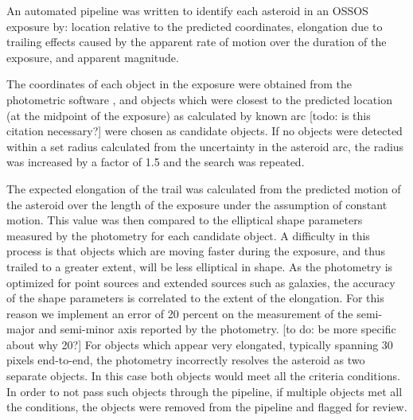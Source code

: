 \documentclass[iop,apj]{emulateapj}
\begin{document}
An automated pipeline was written to identify each asteroid in an OSSOS exposure by: location relative to the predicted coordinates,  elongation due to trailing effects caused by the apparent rate of motion over the duration of the exposure, and apparent magnitude. 

The coordinates of each object in the exposure were obtained from the photometric software \citep{sep}, and objects which were closest to the predicted location (at the midpoint of the exposure) as calculated by known arc \citep{jpl} [todo: is this citation necessary?] were chosen as candidate objects. If no objects were detected within a set radius calculated from the uncertainty in the asteroid arc, the radius was increased by a factor of 1.5 and the search was repeated.

The expected elongation of the trail was calculated from the predicted motion of the asteroid over the length of the exposure \citep{jpl} under the assumption of constant motion. This value was then compared to the elliptical shape parameters measured by the photometry for each candidate object. 
A difficulty in this process is that objects which are moving faster during the exposure, and thus trailed to a greater extent, will be less elliptical in shape. As the photometry is optimized for point sources and extended sources such as galaxies, the accuracy of the shape parameters is correlated to the extent of the elongation. For this reason we implement an error of 20 percent on the measurement of the semi-major and semi-minor axis reported by the photometry. [to do: be more specific about why 20?] For objects which appear very elongated, typically spanning 30 pixels end-to-end, the photometry incorrectly resolves the asteroid as two separate objects. In this case both objects would meet all the criteria conditions. In order to not pass such objects through the pipeline, if multiple objects met all the conditions, the objects were removed from the pipeline and flagged for review.
\end{document}
